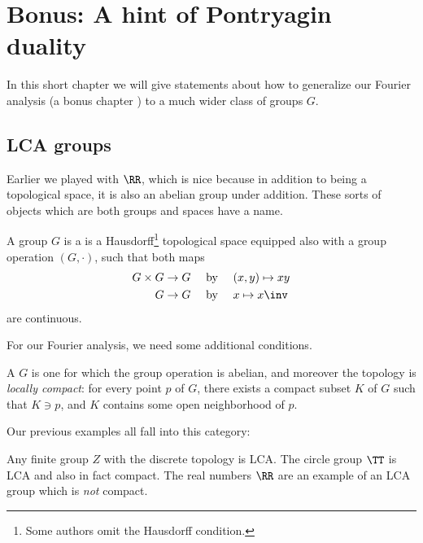 \chapter{Bonus: A hint of Pontryagin duality}
\label{ch:pontryagin}

In this short chapter we will give statements
about how to generalize our Fourier analysis
(a bonus chapter )
to a much wider class of groups $G$.

\section{LCA groups}
Earlier we played with $\RR$,
which is nice because in addition to being a topological space,
it is also an abelian group under addition.
These sorts of objects which are both groups and spaces have a name.
\begin{definition}
	A group $G$ is a 
	is a Hausdorff\footnote{Some authors omit the Hausdorff condition.}
	topological space equipped also with a group operation $(G, \cdot)$,
	such that both maps
	\begin{align*}
		G \times G &\to G \quad\text{ by }\quad (x,y) \mapsto xy \\
		G &\to G \quad\text{ by }\quad x \mapsto x\inv
	\end{align*}
	are continuous.
\end{definition}

For our Fourier analysis, we need some additional conditions.
\begin{definition}
	A  $G$
	is one for which the group operation is abelian,
	and moreover the topology is \emph{locally compact}:
	for every point $p$ of $G$,
	there exists a compact subset $K$ of $G$
	such that $K \ni p$, and $K$ contains some open neighborhood of $p$.
\end{definition}

Our previous examples all fall into this category:
\begin{example}
	\listhack
	\begin{itemize}
		\ii Any finite group $Z$ with the discrete topology is LCA.
		\ii The circle group $\TT$ is LCA and also in fact compact.
		\ii The real numbers $\RR$ are an example of an LCA group
		which is \emph{not} compact.
	\end{itemize}
\end{example}

